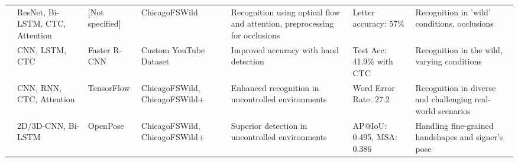 \begin{footnotesize}
\begin{longtable}{LLLLLLL}
        \cite{kabadeAmericanSignLanguage2023}              & ResNet, Bi-LSTM, CTC, Attention                                                                                       & [Not specified]          & ChicagoFSWild                  & Recognition using optical flow and attention, preprocessing for occlusions                                                                                & Letter accuracy: 57\%                                  & Recognition in 'wild' conditions, occlusions                                                                                                                            \\

        \cite{shiAmericanSignLanguage2018}                 & CNN, LSTM, CTC                                                                                                        & Faster R-CNN             & Custom YouTube Dataset         & Improved accuracy with hand detection                                                                                                                     & Test Acc: 41.9\% with CTC                              & Recognition in the wild, varying conditions                                                                                                                             \\

        \cite{shiFingerspellingRecognitionWild2019}        & CNN, RNN, CTC, Attention                                                                                              & TensorFlow               & ChicagoFSWild, ChicagoFSWild+  & Enhanced recognition in uncontrolled environments                                                                                                         & Word Error Rate: 27.2                                  & Recognition in diverse and challenging real-world scenarios                                                                                                             \\

        \cite{shiFingerspellingDetectionAmerican2021}      & 2D/3D-CNN, Bi-LSTM                                                                                                    & OpenPose                 & ChicagoFSWild, ChicagoFSWild+  & Superior detection in uncontrolled environments                                                                                                           & AP@IoU: 0.495, MSA: 0.386                              & Handling fine-grained handshapes and signer’s pose                                                                                                                      \\


\end{longtable}
\end{footnotesize}
